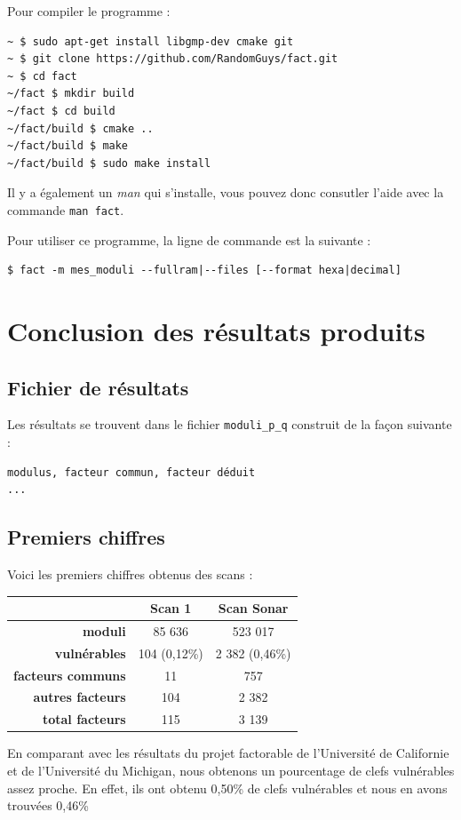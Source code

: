 \documentclass[a4paper,11pt,french]{article}
\begin{document}
Pour compiler le programme :
\begin{verbatim}
~ $ sudo apt-get install libgmp-dev cmake git 
~ $ git clone https://github.com/RandomGuys/fact.git
~ $ cd fact
~/fact $ mkdir build
~/fact $ cd build
~/fact/build $ cmake ..
~/fact/build $ make
~/fact/build $ sudo make install
\end{verbatim}

Il y a également un \textit{man} qui s'installe, vous pouvez donc consutler l'aide avec la commande \verb+man fact+.

Pour utiliser ce programme, la ligne de commande est la suivante :
\begin{verbatim}
$ fact -m mes_moduli --fullram|--files [--format hexa|decimal]
\end{verbatim}


\section{Conclusion des résultats produits}

\subsection{Fichier de résultats}
Les résultats se trouvent dans le fichier \verb+moduli_p_q+ construit de la façon suivante :
\begin{verbatim}
modulus, facteur commun, facteur déduit
...
\end{verbatim}
\subsection{Premiers chiffres}
Voici les premiers chiffres obtenus des scans :
\begin{center}
\begin{tabular}{|r|c|c|}
\hline
\textbf{}&\textbf{Scan 1}&\textbf{Scan Sonar}\\
\hline
\textbf{moduli}&85 636&523 017\\
\hline
\textbf{vulnérables}&104 (0,12\%)&2 382 (0,46\%)\\
\hline
\textbf{facteurs communs}&11&757\\
\hline
\textbf{autres facteurs}&104&2 382\\
\hline
\textbf{total facteurs}&115&3 139\\
\hline
\end{tabular}
\end{center}

En comparant avec les résultats du projet factorable de l'Université de Californie et de l'Université du Michigan, nous obtenons un pourcentage de clefs vulnérables assez proche. En effet, ils ont obtenu 0,50\% de clefs vulnérables et nous en avons trouvées 0,46\% 
\end{document}
